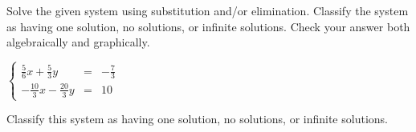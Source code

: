 \documentclass{ximera}
\author{Elizabeth Miller}
\begin{document}
Solve the given system using substitution and/or elimination. Classify the system as having one solution, no solutions, or infinite solutions. Check your answer both algebraically and graphically.

$\left\{ \begin{array}{rcr} \frac{5}{6}x+\frac{5}{3}y & = & -\frac{7}{3}  \\ -\frac{10}{3}x-\frac{20}{3}y & = & 10  \end{array} \right.$

\begin{exercise}
Classify this system as having one solution, no solutions, or infinite solutions.
\begin{multipleChoice}  
\end{multipleChoice}  
\end{exercise}
\end{document}
